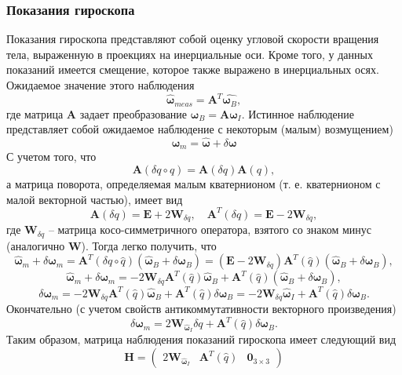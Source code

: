 \documentclass{article}
\begin{document}
\subsubsection{Показания гироскопа}
Показания гироскопа представляют собой оценку угловой скорости вращения тела,
выраженную в проекциях на инерциальные оси. Кроме того, у данных показаний
имеется смещение, которое также выражено в инерциальных осях. Ожидаемое
значение этого наблюдения
$$
\hat{\mathbf{\omega}}_{meas} = \mathbf{A}^T\hat{\mathbf{\omega}_B},
$$
где матрица $ \mathbf{A}$ задает преобразование $\mathbf{\omega}_B =
\mathbf{A}\mathbf{\omega}_I$. Истинное наблюдение представляет собой ожидаемое
наблюдение с некоторым (малым) возмущением)
$$
\mathbf{\omega}_m = \hat{\mathbf{\omega}} + \delta\mathbf{\omega}
$$
С учетом того, что
$$
\mathbf{A}\left(\delta q \circ q\right) =
\mathbf{A}\left(\delta q\right)\mathbf{A}\left(q\right),
$$
а матрица поворота, определяемая малым кватернионом (т. е. кватернионом с
малой векторной частью), имеет вид
$$
\mathbf{A}\left(\delta q\right) = \mathbf{E} + 2\mathbf{W}_{\delta q},\quad
\mathbf{A}^T\left(\delta q\right) = \mathbf{E} - 2\mathbf{W}_{\delta q},
$$
где $\mathbf{W}_{\delta q}$ -- матрица косо-симметричного оператора, взятого со
знаком минус (аналогично $\mathbf{W}$). Тогда легко получить, что 
$$
\hat{\mathbf{\omega}}_m +\delta \mathbf{\omega}_m = \mathbf{A}^T\left(\delta q \circ
\hat{q}\right)\left(\hat{\mathbf{\omega}}_B + \delta \mathbf{\omega}_B\right) = 
\left(\mathbf{E} - 2\mathbf{W}_{\delta q}\right)\mathbf{A}^T\left(\hat{q}\right)
\left(\hat{\mathbf{\omega}}_B + \delta\mathbf{\omega}_B\right),
$$
$$
\hat{\mathbf{\omega}}_m +\delta \mathbf{\omega}_m = 
-2\mathbf{W}_{\delta q}\mathbf{A}^T\left(\hat{q}\right)\hat{\mathbf{\omega}}_B + 
\mathbf{A}^T\left(\hat{q}\right)
\left(\hat{\mathbf{\omega}}_B + \delta\mathbf{\omega}_B\right),
$$
$$
\delta \mathbf{\omega}_m = 
-2\mathbf{W}_{\delta q}\mathbf{A}^T\left(\hat{q}\right)\hat{\mathbf{\omega}}_B + 
\mathbf{A}^T\left(\hat{q}\right)\delta\mathbf{\omega}_B = 
-2\mathbf{W}_{\delta q}\hat{\mathbf{\omega}}_I + 
\mathbf{A}^T\left(\hat{q}\right)\delta\mathbf{\omega}_B.
$$
Окончательно (с учетом свойств антикоммутативности векторного произведения)
$$
\delta \mathbf{\omega}_m = 2\mathbf{W}_{\hat{\mathbf{\omega}}_I} \delta q+ 
\mathbf{A}^T\left(\hat{q}\right)\delta\mathbf{\omega}_B.
$$
Таким образом, матрица наблюдения показаний гироскопа имеет следующий вид
$$
\mathbf{H} = \left(\begin{array}{ccc}
2\mathbf{W}_{\hat{\mathbf{\omega}}_I} &
\mathbf{A}^T\left(\hat{q}\right) &
\mathbf{0}_{3\times 3}
\end{array}\right)
$$
\end{document}
